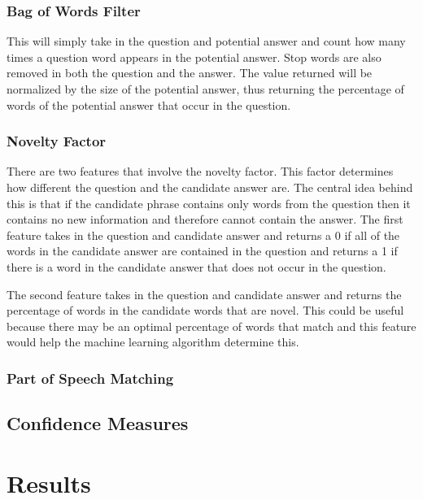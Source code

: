 \documentclass{article}
\begin{document}
\subsubsection{Bag of Words Filter}
This will simply take in the question and potential answer and count how many times a question word appears in the potential answer.  Stop words are also removed in both the question and the answer.  The value returned will be normalized by the size of the potential answer, thus returning the percentage of words of the potential answer that occur in the question.

\subsubsection{Novelty Factor}
There are two features that involve the novelty factor.  This factor determines how different the question and the candidate answer are.  The central idea behind this is that if the candidate phrase contains only words from the question then it contains no new information and therefore cannot contain the answer.  The first feature takes in the question and candidate answer and returns a 0 if all of the words in the candidate answer are contained in the question and returns a 1 if there is a word in the candidate answer that does not occur in the question.

The second feature takes in the question and candidate answer and returns the percentage of words in the candidate words that are novel.  This could be useful because there may be an optimal percentage of words that match and this feature would help the machine learning algorithm determine this. 

\subsubsection{Part of Speech Matching}

\subsection{Confidence Measures}

\section{Results}

\end{document}
